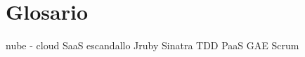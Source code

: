 \documentclass[a4paper,openright,14pt]{book}
\begin{document}
\chapter{Glosario}\label{cap.glossary}

nube - cloud
SaaS
escandallo
Jruby
Sinatra
TDD
PaaS
GAE
Scrum
\end{document}
